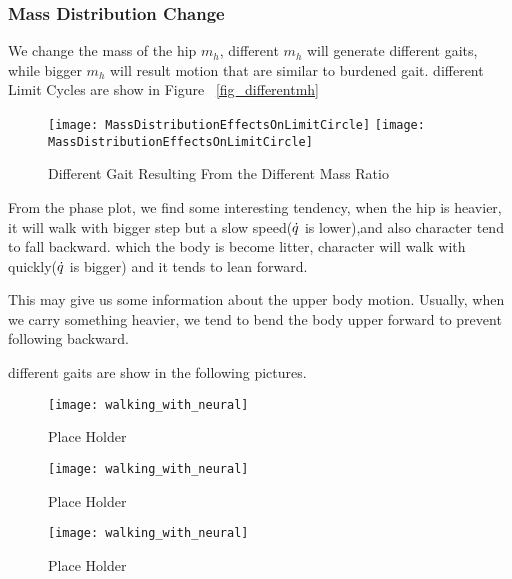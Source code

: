 \subsubsection*{Mass Distribution Change}
We change the mass of the hip $m_h$, different $m_h$ will generate different gaits, while bigger $m_h$ will result motion that are similar to burdened gait.
different Limit Cycles are show in Figure ~\ref{fig_differentmh}
\begin{figure}[!htbp]
  \begin{center}
    \leavevmode
    \ifpdf
      \texttt{[image: MassDistributionEffectsOnLimitCircle]}
    \else
      \texttt{[image: MassDistributionEffectsOnLimitCircle]}
    \fi
    \caption{Different Gait Resulting From the Different Mass Ratio}
    \label{fig:differentmh}
\end{center}
\end{figure}

From the phase plot, we find some interesting tendency,
when the hip is heavier, it will walk with bigger step but a slow speed($\dot{q}$ is lower),and also character tend to fall backward.
which the body is become litter, character will walk with quickly($\dot{q}$ is bigger) and it tends to lean forward.

This may give us some information about the upper body motion.
Usually, when we carry something heavier, we  tend to bend the body upper forward to prevent following backward.

different gaits are show in the following pictures.
\begin{figure}[!htbp]
  \begin{center}
      \texttt{[image: walking\_with\_neural]}
    \caption{Place Holder}
    \label{fig:massh1}
\end{center}
\end{figure}

\begin{figure}[!htbp]
  \begin{center}
      \texttt{[image: walking\_with\_neural]}
    \caption{Place Holder}
    \label{fig:massh2}
\end{center}
\end{figure}

\begin{figure}[!htbp]
  \begin{center}
      \texttt{[image: walking\_with\_neural]}
    \caption{Place Holder}
    \label{fig:massh3}
\end{center}
\end{figure}

